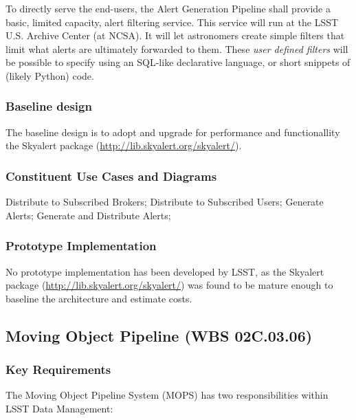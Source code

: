 \documentclass[12pt]{article}
\newcommand{\wbsMOPS}{WBS 02C.03.06}
\begin{document}
To directly serve the end-users, the Alert Generation Pipeline shall provide a basic, limited capacity, alert filtering service. This service will run at the LSST U.S. Archive Center (at NCSA). It will let astronomers create simple filters that limit what alerts are ultimately forwarded to them. These {\em user defined filters} will be possible to specify using an SQL-like declarative language, or short snippets of (likely Python) code.

\subsubsection{Baseline design}

The baseline design is to adopt and upgrade for performance and functionallity the Skyalert package (\url{http://lib.skyalert.org/skyalert/}).

\subsubsection{Constituent Use Cases and Diagrams}

Distribute to Subscribed Brokers; Distribute to Subscribed Users; Generate Alerts;
Generate and Distribute Alerts;

\subsubsection{Prototype Implementation}

No prototype implementation has been developed by LSST, as the Skyalert package (\url{http://lib.skyalert.org/skyalert/}) was found to be mature enough to baseline the architecture and estimate costs.

\clearpage

\subsection{Moving Object Pipeline (\wbsMOPS)}

\subsubsection{Key Requirements}

The Moving Object Pipeline System (MOPS) has two responsibilities within LSST Data Management:
\end{document}
